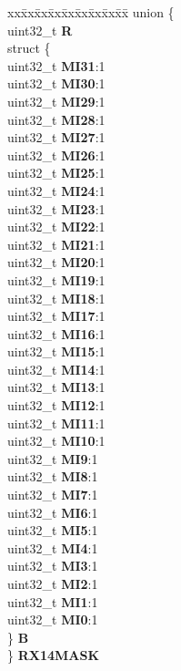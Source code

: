 \begin{DoxyCompactItemize}
\begin{tabbing}
\end{tabbing}\item 
\mbox{\label{structFLEXCAN2__tag_a05d4591fb30dad0ed84fd45c79bbe77e}} 
\begin{tabbing}
xx\=xx\=xx\=xx\=xx\=xx\=xx\=xx\=xx\=\kill
union \{\\
\>uint32\_t {\bfseries R}\\
\>struct \{\\
\>\>uint32\_t {\bfseries MI31}:1\\
\>\>uint32\_t {\bfseries MI30}:1\\
\>\>uint32\_t {\bfseries MI29}:1\\
\>\>uint32\_t {\bfseries MI28}:1\\
\>\>uint32\_t {\bfseries MI27}:1\\
\>\>uint32\_t {\bfseries MI26}:1\\
\>\>uint32\_t {\bfseries MI25}:1\\
\>\>uint32\_t {\bfseries MI24}:1\\
\>\>uint32\_t {\bfseries MI23}:1\\
\>\>uint32\_t {\bfseries MI22}:1\\
\>\>uint32\_t {\bfseries MI21}:1\\
\>\>uint32\_t {\bfseries MI20}:1\\
\>\>uint32\_t {\bfseries MI19}:1\\
\>\>uint32\_t {\bfseries MI18}:1\\
\>\>uint32\_t {\bfseries MI17}:1\\
\>\>uint32\_t {\bfseries MI16}:1\\
\>\>uint32\_t {\bfseries MI15}:1\\
\>\>uint32\_t {\bfseries MI14}:1\\
\>\>uint32\_t {\bfseries MI13}:1\\
\>\>uint32\_t {\bfseries MI12}:1\\
\>\>uint32\_t {\bfseries MI11}:1\\
\>\>uint32\_t {\bfseries MI10}:1\\
\>\>uint32\_t {\bfseries MI9}:1\\
\>\>uint32\_t {\bfseries MI8}:1\\
\>\>uint32\_t {\bfseries MI7}:1\\
\>\>uint32\_t {\bfseries MI6}:1\\
\>\>uint32\_t {\bfseries MI5}:1\\
\>\>uint32\_t {\bfseries MI4}:1\\
\>\>uint32\_t {\bfseries MI3}:1\\
\>\>uint32\_t {\bfseries MI2}:1\\
\>\>uint32\_t {\bfseries MI1}:1\\
\>\>uint32\_t {\bfseries MI0}:1\\
\>\} {\bfseries B}\\
\} {\bfseries RX14MASK}\\


\end{tabbing}
\end{DoxyCompactItemize}
